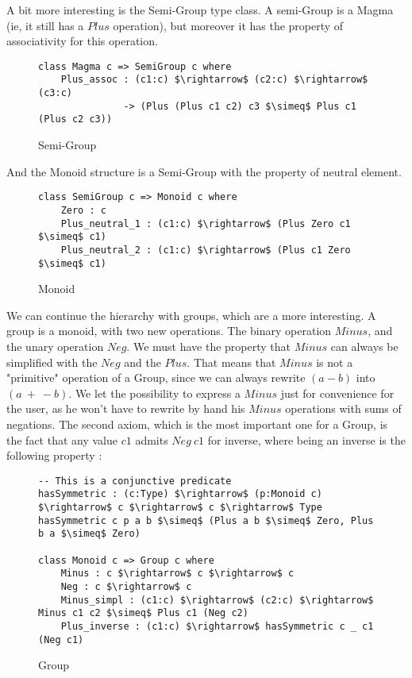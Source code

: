 A bit more interesting is the Semi-Group type class. A semi-Group is a Magma (ie, it still has a $Plus$ operation), but moreover it has the property of associativity for this operation.

\begin{figure}[H]
\figrule
\begin{center}
\begin{lstlisting}
class Magma c => SemiGroup c where
    Plus_assoc : (c1:c) $\rightarrow$ (c2:c) $\rightarrow$ (c3:c) 
               -> (Plus (Plus c1 c2) c3 $\simeq$ Plus c1 (Plus c2 c3))
\end{lstlisting}
\end{center}
\caption{Semi-Group}
\figrule
\end{figure}

And the Monoid structure is a Semi-Group with the property of neutral element.

\begin{figure}[H]
\figrule
\begin{center}
\begin{lstlisting}
class SemiGroup c => Monoid c where
    Zero : c    
    Plus_neutral_1 : (c1:c) $\rightarrow$ (Plus Zero c1 $\simeq$ c1)    
    Plus_neutral_2 : (c1:c) $\rightarrow$ (Plus c1 Zero $\simeq$ c1)
\end{lstlisting}
\end{center}
\caption{Monoid}
\figrule
\end{figure}
We can continue the hierarchy with groups, which are a more interesting.
A group is a monoid, with two new operations. The binary operation $Minus$, and the unary operation $Neg$. We must have the property that $Minus$ can always be simplified with the $Neg$ and the $Plus$. That means that $Minus$ is not a "primitive" operation of a Group, since we can always rewrite $(a-b)$ into $(a\ +\ -b)$. We let the possibility to express a $Minus$ just for convenience for the user, as he won't have to rewrite by hand his $Minus$ operations with sums of negations.
The second axiom, which is the most important one for a Group, is the fact that any value $c1$ admits $Neg\ c1$ for inverse, where being an inverse is the following property :

\begin{figure}[H]
\figrule
\begin{center}
\begin{lstlisting}
-- This is a conjunctive predicate
hasSymmetric : (c:Type) $\rightarrow$ (p:Monoid c) $\rightarrow$ c $\rightarrow$ c $\rightarrow$ Type
hasSymmetric c p a b $\simeq$ (Plus a b $\simeq$ Zero, Plus b a $\simeq$ Zero)    
  
class Monoid c => Group c where
    Minus : c $\rightarrow$ c $\rightarrow$ c
    Neg : c $\rightarrow$ c
    Minus_simpl : (c1:c) $\rightarrow$ (c2:c) $\rightarrow$ Minus c1 c2 $\simeq$ Plus c1 (Neg c2) 
    Plus_inverse : (c1:c) $\rightarrow$ hasSymmetric c _ c1 (Neg c1)
\end{lstlisting}
\end{center}
\caption{Group}
\figrule
\end{figure}


